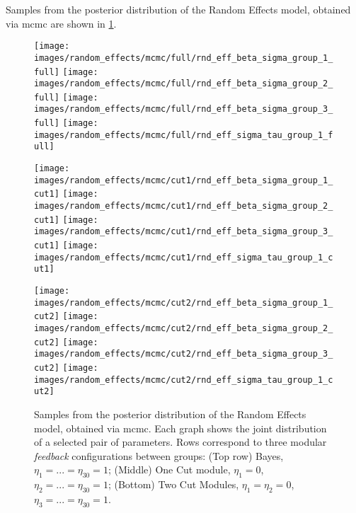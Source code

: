 Samples from the posterior distribution of the Random Effects model, obtained via \acrshort*{mcmc} are shown in \cref{fig:rnd_eff_mcmc}.

\begin{figure}[!ht]
  \centering
  \texttt{[image: images/random\_effects/mcmc/full/rnd\_eff\_beta\_sigma\_group\_1\_full]}
  \texttt{[image: images/random\_effects/mcmc/full/rnd\_eff\_beta\_sigma\_group\_2\_full]}
  \texttt{[image: images/random\_effects/mcmc/full/rnd\_eff\_beta\_sigma\_group\_3\_full]}
  \texttt{[image: images/random\_effects/mcmc/full/rnd\_eff\_sigma\_tau\_group\_1\_full]}

  \texttt{[image: images/random\_effects/mcmc/cut1/rnd\_eff\_beta\_sigma\_group\_1\_cut1]}
  \texttt{[image: images/random\_effects/mcmc/cut1/rnd\_eff\_beta\_sigma\_group\_2\_cut1]}
  \texttt{[image: images/random\_effects/mcmc/cut1/rnd\_eff\_beta\_sigma\_group\_3\_cut1]}
  \texttt{[image: images/random\_effects/mcmc/cut1/rnd\_eff\_sigma\_tau\_group\_1\_cut1]}

  \texttt{[image: images/random\_effects/mcmc/cut2/rnd\_eff\_beta\_sigma\_group\_1\_cut2]}
  \texttt{[image: images/random\_effects/mcmc/cut2/rnd\_eff\_beta\_sigma\_group\_2\_cut2]}
  \texttt{[image: images/random\_effects/mcmc/cut2/rnd\_eff\_beta\_sigma\_group\_3\_cut2]}
  \texttt{[image: images/random\_effects/mcmc/cut2/rnd\_eff\_sigma\_tau\_group\_1\_cut2]}
  \caption[Epidemiology model MCMC]{
    Samples from the posterior distribution of the Random Effects model, obtained via \acrshort*{mcmc}.
    Each graph shows the joint distribution of a selected pair of parameters. Rows correspond to three modular \emph{feedback} configurations between groups: (Top row) Bayes, $\eta_1=...=\eta_{30}=1$; (Middle) One Cut module, $\eta_1=0$, $\eta_2=...=\eta_{30}=1$; (Bottom) Two Cut Modules, $\eta_1=\eta_2=0$, $\eta_3=...=\eta_{30}=1$.
  }
  \label{fig:rnd_eff_mcmc}
\end{figure}


